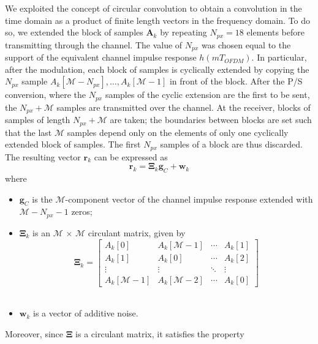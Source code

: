 \documentclass[a4paper, 12pt]{report}
\begin{document}
We exploited the concept of circular convolution to obtain a convolution in the time domain as a product of finite length vectors in the frequency domain. To do so, we extended the block of samples $\mathbf{A}_k$ by repeating $N_{px}=18$ elements before transmitting through the channel. The value of $N_{px}$ was chosen equal to the support of the equivalent channel impulse response $h(mT_{OFDM})$. In particular, after the modulation, each block of samples is cyclically extended by copying the $N_{px}$ sample $A_k[\mathcal{M}-N_{px}],\dots,A_k[\mathcal{M}-1]$ in front of the block. After the P/S conversion, where the $N_{px}$ samples of the cyclic extension are the first to be sent, the $N_{px}+\mathcal{M}$ samples are transmitted over the channel.  At the receiver, blocks of samples of length $N_{px}+\mathcal{M}$ are taken; the boundaries between blocks are set such that the last $\mathcal{M}$ samples depend only on the elements of only one cyclically extended block of samples. The first $N_{px}$ samples of a block are thus discarded. \\
The resulting vector $\mathbf{r}_k$ can be expressed as 
\begin{equation}
\mathbf{r}_k = \mathbf{\Xi}_k\mathbf{g}_C + \mathbf{w}_k
\end{equation}
where 

\begin{itemize}
	\item $\mathbf{g}_C$ is the $\mathcal{M}$-component vector of the channel impulse response extended with $\mathcal{M}-N_{px}-1$ zeros;
	\item $\mathbf{\Xi}_k$ is an $\mathcal{M}$ $\times$ $\mathcal{M}$ circulant matrix, given by
	\begin{equation*}
	\mathbf{\Xi}_k = \begin{bmatrix}
						A_k[0] & A_k[\mathcal{M}-1] & \cdots & A_k[1] \\
						A_k[1] & A_k[0] & \cdots & A_k[2] \\
						\vdots & \vdots & \ddots & \vdots \\
						A_k[\mathcal{M}-1] & A_k[\mathcal{M}-2] & \cdots & A_k[0]
	\end{bmatrix}
	\end{equation*} \\
	
	\item $ \mathbf{w}_k$ is a vector of additive noise. 
\end{itemize}

Moreover, since $\mathbf{\Xi}$ is a circulant matrix, it satisfies the property
\end{document}
